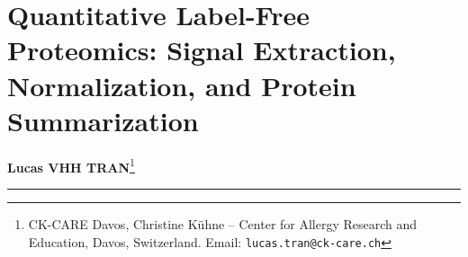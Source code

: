 \documentclass[11pt,oneside]{book}
\begin{document}
\setcounter{chapter}{13}
\chapter{Quantitative Label-Free Proteomics: Signal Extraction, Normalization, and Protein Summarization}

\noindent
\textbf{Lucas VHH TRAN}\footnote{CK-CARE Davos, Christine K\"uhne -- Center for Allergy Research and Education, Davos, Switzerland. Email: \texttt{lucas.tran@ck-care.ch}}\\
\rule{\textwidth}{0.8pt}

\begin{abstract}
\noindent
Label-free quantification (LFQ) represents the dominant and most versatile strategy in contemporary bottom-up proteomics, bypassing the sample capacity constraints, chemical cost, and ratio distortion artifacts characteristic of isobaric isotopic labeling. In LFQ workflows, each biological specimen is acquired within an independent chromatographic and mass spectrometric run; consequently, absolute signal intensities are not directly comparable until biological variance is disentangled from run-to-run instrument drift, retention time slippage, and peptide-specific electrospray ionization efficiencies. 

This chapter presents the mathematical, statistical, and algorithmic principles required to construct a rigorous, reproducible LFQ protein abundance matrix. We develop the hierarchical linear model of ion intensity generation, formulate the quadratic optimization problem of MaxLFQ pairwise ratio preservation, analyze Top$N$ stoichiometric estimation, and evaluate robust M-estimation via Tukey's biweight function. We dissect three foundational normalization methodologies---median centering, variance stabilizing normalization (VSN), and cyclic LOESS---and examine their mathematical impact on the mean-variance relationship. We compare data-dependent acquisition (DDA) with wide-window data-independent acquisition (DIA/SWATH) and evaluate the absolute quantification frontier (Top3, emPAI, and iBAQ). The computational curriculum is operationalized through a step-by-step hands-on laboratory in R 4.6 and Bioconductor using the landmark 11-laboratory Data-Independent Acquisition (DIA) benchmark study (PXD004886). We conclude with a tutor diagnostic heuristics checklist, an audit of the five deadly sins of LFQ preprocessing, multi-tier conceptual and mathematical exercises, and exhaustive, step-by-step worked-out solutions.
\end{abstract}
\end{document}
